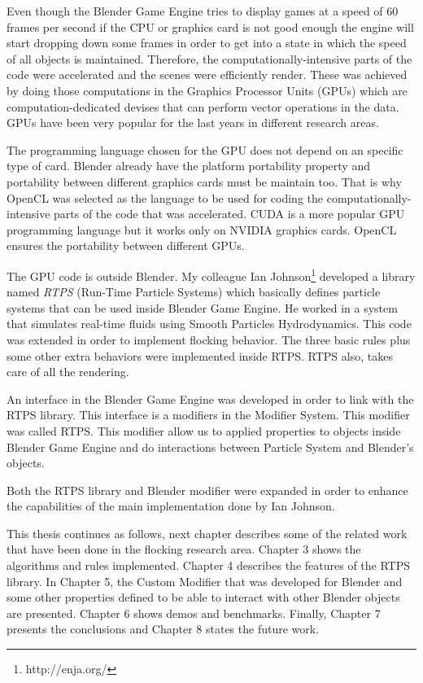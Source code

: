 
Even though the Blender Game Engine tries to display games at a speed of 60 frames per second\cite{bookGameKit2} if the CPU or graphics card is not good enough the engine will start dropping down some frames in order to get into a state in which the speed of all objects is maintained. Therefore, the computationally-intensive parts of the code were accelerated and the scenes were efficiently render. These was achieved by doing those computations in the Graphics Processor Units (GPUs) which are computation-dedicated devises that can perform vector operations in the data. GPUs have been very popular for the last years in different research areas. 

The programming language chosen for the GPU does not depend on an specific type of card. Blender already have the platform portability property and portability between different graphics cards must be maintain too. That is why OpenCL was selected as the language to be used for coding the computationally-intensive parts of the code that was accelerated. CUDA is a more popular GPU programming language but it works only on NVIDIA graphics cards. OpenCL ensures the portability between different GPUs.


The GPU code is outside Blender. My colleague Ian Johnson\footnote{http://enja.org/} developed a library named \textit{RTPS} (Run-Time Particle Systems) which basically defines particle systems that can be used inside Blender Game Engine. He worked in a system that simulates real-time fluids using Smooth Particles Hydrodynamics. This code was extended in order to implement flocking behavior. The three basic rules plus some other extra behaviors were implemented inside RTPS. RTPS also, takes care of all the rendering.

An interface in the Blender Game Engine was developed in order to link with the RTPS library. This interface is a modifiers in the Modifier System. This modifier was called RTPS. This modifier allow us to applied properties to objects inside Blender Game Engine and do interactions between Particle System and Blender's objects.

Both the RTPS library and Blender modifier were expanded in order to enhance the capabilities of the main implementation done by Ian Johnson.


This thesis continues as follows, next chapter describes some of the related work that have been done in the flocking research area. Chapter 3 shows the algorithms and rules implemented. Chapter 4 describes the features of the RTPS library. In Chapter 5, the Custom Modifier that was developed for Blender and some other properties defined to be able to interact with other Blender objects are presented. Chapter 6 shows demos and benchmarks. Finally, Chapter 7 presents the conclusions and Chapter 8 states the future work. 

